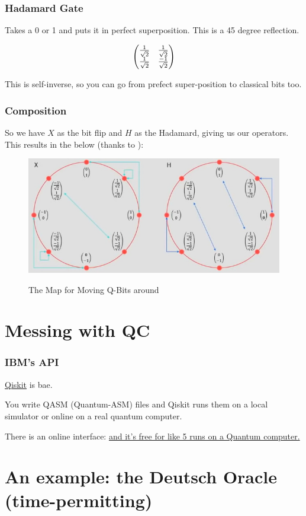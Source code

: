 \documentclass{beamer}
\begin{document}
\begin{frame}
\frametitle{Hadamard Gate}
Takes a 0 or 1 and puts it in perfect
superposition. This is a 45 degree reflection.

\[
    \begin{pmatrix}
    {1 \over \sqrt{2}} & {1 \over \sqrt{2}}\\
    {1 \over \sqrt{2}} & {-1 \over \sqrt{2}}
    \end{pmatrix}
\]

This is self-inverse, so you can go from
prefect super-position to classical bits too.
\end{frame}

\begin{frame}
\frametitle{Composition}
So we have $X$ as the bit flip and
$H$ as the Hadamard, giving us our operators. This results in the below (thanks to \cite{img-blog}):
\begin{figure}
    \centering
    \includegraphics[width=.75\linewidth]{qt-unit-circle.jpg}
    \label{fig:qt-unit-circle}
    \caption{The Map for Moving Q-Bits around}
\end{figure}
\end{frame}

\section{Messing with QC}

\begin{frame}
\frametitle{IBM's API}
\href{https://qiskit.org/}{Qiskit} is bae.

You write QASM (Quantum-ASM) files and Qiskit runs them on a local simulator or online on a real quantum computer.

There is an online interface: \href{https://quantumexperience.ng.bluemix.net/qx/editor}{and it's free for like 5 runs on a Quantum computer.}
\end{frame}

\section{An example: the Deutsch Oracle (time-permitting)}
\end{document}
